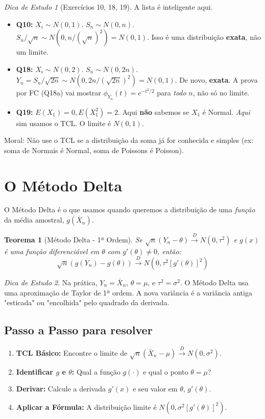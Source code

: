 \documentclass[a4paper, 10pt]{article} %
\theoremstyle{definition}
\theoremstyle{plain}
\newtheorem{theorem}{Teorema}[section]
\theoremstyle{remark}
\newtheorem*{tip}{Dica de Estudo} %
\newcommand{\dto}{\xrightarrow{D}}      %
\newcommand{\Xn}{\bar{X}_n}             %
\begin{document}
\begin{tip}[Exercícios 10, 18, 19]
    A lista é inteligente aqui.
    \begin{itemize}
        \item \textbf{Q10:} $X_i \sim N(0,1)$. $S_n \sim N(0, n)$. $S_n/\sqrt{n} \sim N(0, n/(\sqrt{n})^2) = N(0,1)$. Isso é uma distribuição \textbf{exata}, não um limite.
        \item \textbf{Q18:} $X_i \sim N(0,2)$. $S_n \sim N(0, 2n)$. $Y_n = S_n/\sqrt{2n} \sim N(0, 2n/(\sqrt{2n})^2) = N(0,1)$. De novo, \textbf{exata}. A prova por FC (Q18a) vai mostrar $\phi_{Y_n}(t) = e^{-t^2/2}$ para \textit{todo} $n$, não só no limite.
        \item \textbf{Q19:} $E(X_1)=0, E(X_1^2)=2$. Aqui \textbf{não} sabemos se $X_1$ é Normal. \textit{Aqui} sim usamos o TCL. O limite é $N(0,1)$.
    \end{itemize}
    Moral: Não use o TCL se a distribuição da soma já for conhecida e simples (ex: soma de Normais é Normal, soma de Poissons é Poisson).
\end{tip}

\section{O Método Delta}
\label{sec:delta}
O Método Delta é o que usamos quando queremos a distribuição de uma \textit{função} da média amostral, $g(\Xn)$.

\begin{theorem}[Método Delta - 1ª Ordem]
Se $\sqrt{n}(Y_n - \theta) \dto N(0, \tau^2)$ e $g(x)$ é uma função diferenciável em $\theta$ com $g'(\theta) \neq 0$, então:
$$ \sqrt{n}(g(Y_n) - g(\theta)) \dto N(0, \tau^2 [g'(\theta)]^2) $$
\end{theorem}

\begin{tip}
    Na prática, $Y_n = \Xn$, $\theta = \mu$, e $\tau^2 = \sigma^2$. O Método Delta usa uma aproximação de Taylor de 1ª ordem. A nova variância é a variância antiga "esticada" ou "encolhida" pelo quadrado da derivada.
\end{tip}

\subsection{Passo a Passo para resolver}

\begin{enumerate}
    \item \textbf{TCL Básico:} Encontre o limite de $\sqrt{n}(\Xn - \mu) \dto N(0, \sigma^2)$.
    \item \textbf{Identificar $g$ e $\theta$:} Qual a função $g(\cdot)$ e qual o ponto $\theta = \mu$?
    \item \textbf{Derivar:} Calcule a derivada $g'(x)$ e seu valor em $\theta$, $g'(\theta)$.
    \item \textbf{Aplicar a Fórmula:} A distribuição limite é $N(0, \sigma^2 [g'(\theta)]^2)$.
\end{enumerate}
\end{document}

